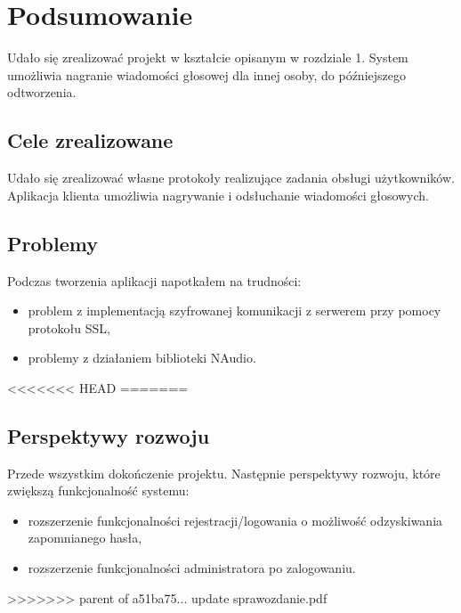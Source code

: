 \documentclass[12pt,a4paper]{article}
\begin{document}
	\pagebreak
	\section{Podsumowanie}
	\par Udało się zrealizować projekt w kształcie opisanym w rozdziale 1. System umożliwia nagranie wiadomości głosowej dla innej osoby, do późniejszego odtworzenia.
		
	\subsection{Cele zrealizowane}
	\par Udało się zrealizować własne protokoły realizujące zadania obsługi użytkowników. Aplikacja klienta umożliwia nagrywanie i odsłuchanie wiadomości głosowych. 
	
	\subsection{Problemy}
	Podczas tworzenia aplikacji napotkałem na trudności:
	\begin{itemize}
		\item problem z implementacją szyfrowanej komunikacji z serwerem przy pomocy protokołu SSL,
		\item problemy z działaniem biblioteki NAudio.
	\end{itemize}
	
<<<<<<< HEAD
=======
	\subsection{Perspektywy rozwoju}
	\par Przede wszystkim dokończenie projektu. Następnie perspektywy rozwoju, które zwiększą funkcjonalność systemu:
	\begin{itemize}
		\item rozszerzenie funkcjonalności rejestracji/logowania o możliwość odzyskiwania zapomnianego hasła,
		\item rozszerzenie funkcjonalności administratora po zalogowaniu.
	\end{itemize}
	
	
>>>>>>> parent of a51ba75... update sprawozdanie.pdf
\end{document}
